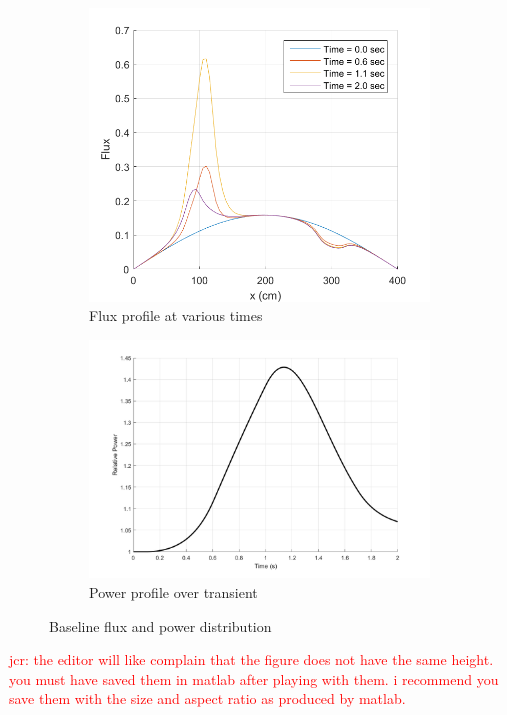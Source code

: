 \documentclass{elsarticle}
\newcommand{\jcr}[1]{\textcolor{red}{jcr: #1}}
\begin{document}
\begin{figure}[!htbp]
\centering
\begin{subfigure}[b]{0.49\textwidth}
\centering
\includegraphics[width=0.99\textwidth]{figures/1D_flux.png}
\caption{Flux profile at various times}
\label{fig:1D_flux}
\end{subfigure}
\begin{subfigure}[b]{0.49\textwidth}
\centering
\includegraphics[width=0.99\textwidth]{figures/1D_power_base.png}
\caption{Power profile over transient}
\label{fig:1D_tot_power}
\end{subfigure}
\caption{Baseline flux and power distribution}
\label{fig:1D}
\end{figure}
\jcr{the editor will like complain that the figure does not have the same height. you must have saved them in matlab after playing with them. i recommend you save them with the size and aspect ratio as produced by matlab.}
\end{document}
